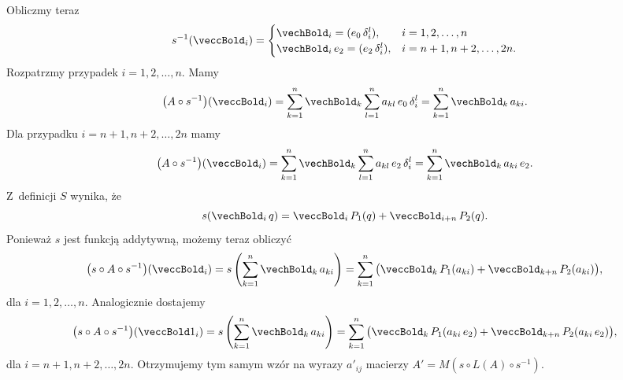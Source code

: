 \documentclass[a4paper,11pt]{article}
\numberwithin{equation}{section}
\begin{document}
Obliczmy teraz
\begin{equation}
  \label{eq:Wojtynski-91}
  s^{ -1 }( \veccBold_{ i } ) =
  \begin{cases}
    \vechBold_{ i } = ( e_{ 0 } \, \delta^{ l }_{ i } ), &i = 1, 2, \ldots, n \\
    \vechBold_{ i } \, e_{ 2 } = ( e_{ 2 } \, \delta^{ l }_{ i } ),
    &i = n + 1, n + 2, \ldots, 2n.
  \end{cases}
\end{equation}
Rozpatrzmy przypadek $i = 1, 2, \ldots, n$. Mamy
\begin{equation}
  \label{eq:Wojtynski-92}
  \big( A \circ s^{ -1 } \big)( \veccBold_{ i } ) =
  \sum_{ k = 1 }^{ n } \vechBold_{ k } \sum_{ l = 1 }^{ n }
  a_{ k l } \, e_{ 0 } \, \delta^{ l }_{ i } =
  \sum_{ k = 1 }^{ n } \vechBold_{ k } \, a_{ k i }.
\end{equation}
Dla przypadku $i = n + 1, n + 2, \ldots, 2n$ mamy
\begin{equation}
  \label{eq:Wojtynski-93}
  \big( A \circ s^{ -1 } \big)( \veccBold_{ i } ) =
  \sum_{ k = 1 }^{ n } \vechBold_{ k } \sum_{ l = 1 }^{ n }
  a_{ k l } \, e_{ 2 } \, \delta^{ l }_{ i } =
  \sum_{ k = 1 }^{ n } \vechBold_{ k } \, a_{ k i } \, e_{ 2 }.
\end{equation}
Z~definicji $S$ wynika, że
\begin{equation}
  \label{eq:Wojtynski-94}
  s( \vechBold_{ i } \, q ) =
  \veccBold_{ i } \, P_{ 1 }( q ) + \veccBold_{ i + n } \, P_{ 2 }( q ).
\end{equation}
Ponieważ $s$ jest funkcją addytywną, możemy teraz obliczyć
\begin{equation}
  \label{eq:Wojtynski-95}
  \big( s \circ A \circ s^{ -1 } \big)( \veccBold_{ i } ) =
  s\left( \sum_{ k = 1 }^{ n } \vechBold_{ k } \, a_{ k i } \right) =
  \sum_{ k = 1 }^{ n } \big( \veccBold_{ k } \, P_{ 1 }( a_{ k i } ) +
  \veccBold_{ k + n } \, P_{ 2 }( a_{ k i } ) \big),
\end{equation}
dla $i = 1, 2, \ldots, n$. Analogicznie dostajemy
\begin{equation}
  \label{eq:Wojtynski-96}
  \big( s \circ A \circ s^{ -1 } \big)( \veccBold1_{ i } ) =
  s\left( \sum_{ k = 1 }^{ n } \vechBold_{ k } \, a_{ k i } \right) =
  \sum_{ k = 1 }^{ n } \big( \veccBold_{ k } \, P_{ 1 }( a_{ k i } \, e_{ 2 } ) +
  \veccBold_{ k + n } \, P_{ 2 }( a_{ k i } \, e_{ 2 } ) \big),
\end{equation}
dla $i = n + 1, n + 2, \ldots, 2n$. Otrzymujemy tym samym wzór na wyrazy
$a'_{ i j }$ macierzy $A' = M\!\left( s \circ L( A ) \circ s^{ -1 } \right)$.
\end{document}
